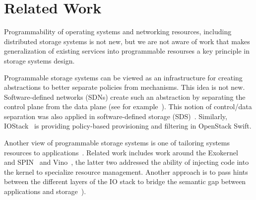 \documentclass[10pt,twocolumn]{article}
\begin{document}
%
%
%

\section{Related Work}


Programmability of operating systems and networking resources, including
distributed storage systems is not new, but we are not aware of work that makes
generalization of existing services into programmable resourses a key principle
in storage systems design. 

Programmable storage systems can be viewed as an infrastructure for creating
abstractions to better separate policies from mechanisms. This idea is not new.
Software-defined networks (SDNs) create such an abstraction by separating the
control plane from the data plane (see for example~\cite{jain:sigcomm13}). This
notion of control/data separation was also applied in software-defined storage
(SDS)~\cite{arpaci:sosp01,thereska:sosp13,stefanovici:fast16}. Similarly,
IOStack~\cite{gracia:internet16} is providing policy-based provisioning and
filtering in OpenStack Swift. 

Another view of programmable storage systems is one of tailoring systems
resources to applications~\cite{arpaci:sosp01}. Related work includes work
around the Exokernel~\cite{engler:sosp95} and SPIN~\cite{bershad:sosp95} and
Vino~\cite{seltzer:osdi96}, the latter two addressed the ability of injecting
code into the kernel to specialize resource management. Another approach is to
pass hints between the different layers of the IO stack to bridge the semantic
gap between applications and
storage~\cite{arpaci:sosp01,sivathanu:fast03,mesnier:sosp11}).
\end{document}
